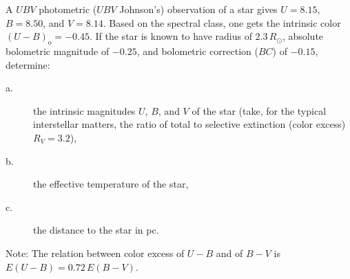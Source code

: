 A $UBV$ photometric ($UBV$ Johnson's) observation of a star gives
$U = 8.15$, $B = 8.50$, and $V = 8.14$. Based on the spectral class, one gets
the intrinsic color $(U-B)_{\mathrm{o}} = -0.45$. If the star is known to
have radius of $2.3\,R_\odot$, absolute bolometric magnitude of $-0.25$, and
bolometric correction ($BC$) of $-0.15$, determine:
\begin{description}
\item[a.] the intrinsic magnitudes $U$, $B$, and $V$ of the star (take, for
  the typical interstellar matters, the ratio of total to selective
  extinction (color excess) $R_V = 3.2$),
\item[b.] the effective temperature of the star,
\item[c.] the distance to the star in pc.
\end{description}
Note: The relation between color excess of $U-B$ and of $B-V$ is
$E(U-B) = 0.72\,E(B-V)$.
